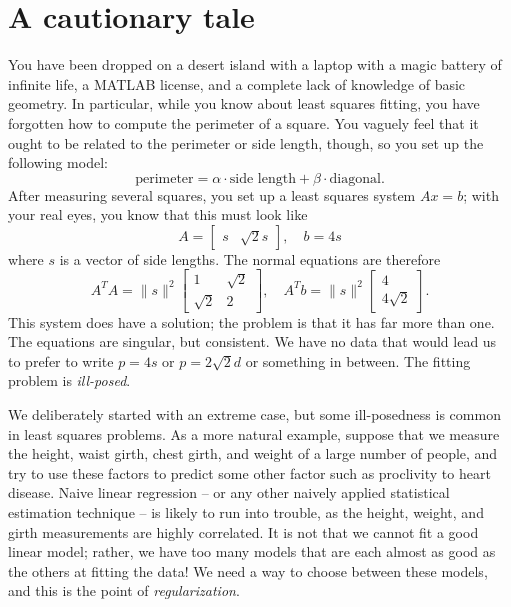 \documentclass[12pt, leqno]{article}
\begin{document}



\section{A cautionary tale}


You have been dropped on a desert island with a laptop with a magic
battery of infinite life, a MATLAB license, and a complete lack of
knowledge of basic geometry.  In particular, while you know about
least squares fitting, you have forgotten how to compute the perimeter
of a square.  You vaguely feel that it ought to be related to the
perimeter or side length, though, so you set up the following model:
\[
  \mbox{perimeter} = \alpha \cdot \mbox{side length} + \beta \cdot \mbox{diagonal}.
\]
After measuring several squares, you set up a least squares system
$Ax = b$; with your real eyes, you know that this must look
like
\[
  A = \begin{bmatrix} s & \sqrt{2} s \end{bmatrix}, \quad
  b = 4 s
\]
where $s$ is a vector of side lengths.  The normal equations are
therefore
\[
A^T A = \|s\|^2
\begin{bmatrix} 1 & \sqrt{2} \\ \sqrt{2} & 2 \end{bmatrix}, \quad
A^T b = \|s\|^2
\begin{bmatrix} 4 \\ 4 \sqrt{2} \end{bmatrix}.
\]
This system does have a solution; the problem is that it has far more
than one.  The equations are singular, but consistent.
We have no data that would lead us to prefer to write
$p = 4s$ or $p = 2 \sqrt{2} d$ or something in between.
The fitting problem is {\em ill-posed}.

We deliberately started with an extreme case, but some ill-posedness
is common in least squares problems.  As a more natural example,
suppose that we measure the height, waist girth, chest girth, and
weight of a large number of people, and try to use these factors to
predict some other factor such as proclivity to heart disease.  Naive
linear regression -- or any other naively applied statistical
estimation technique -- is likely to run into trouble, as the height,
weight, and girth measurements are highly correlated.  It is not that
we cannot fit a good linear model; rather, we have too many models
that are each almost as good as the others at fitting the data!  We
need a way to choose between these models, and this is the point of
{\em regularization}.
\end{document}
